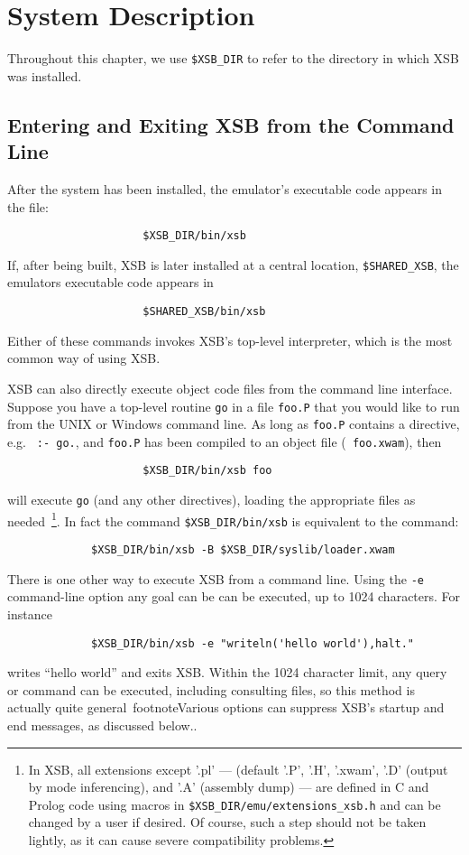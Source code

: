 \chapter{System Description} \label{chap:system}
\label{system}


Throughout this chapter, we use \verb'$XSB_DIR' to refer to the
directory in which XSB was installed.

\section{Entering and Exiting XSB from the Command Line}

After the system has been installed, the emulator's executable code appears 
in the file:
\begin{verbatim}
                     $XSB_DIR/bin/xsb
\end{verbatim}
If, after being built, XSB is later installed  at a central location,
\verb'$SHARED_XSB', the emulators executable code appears in
\begin{verbatim}
                     $SHARED_XSB/bin/xsb
\end{verbatim}
Either of these commands invokes XSB's top-level interpreter, which is
the most common way of using XSB.

XSB can also directly execute object code files from the command line
interface.  Suppose you have a top-level routine {\tt go} in a file
{\tt foo.P} that you would like to run from the UNIX or Windows
command line.  As long as {\tt foo.P} contains a directive, e.g. {\tt
  :- go.}, and {\tt foo.P} has been compiled to an object file ({\tt
  foo.xwam}), then
\begin{verbatim}
                     $XSB_DIR/bin/xsb foo
\end{verbatim}
will execute {\tt go} (and any other directives), loading the
appropriate files as needed~\footnote{In XSB, all extensions except
  '.pl' --- (default '.P', '.H', '.xwam', '.D' (output by mode
  inferencing), and '.A' (assembly dump) --- are defined in C and
  Prolog code using macros in {\tt \$XSB\_DIR/emu/extensions\_xsb.h}
  and can be changed by a user if desired.  Of course, such a step
  should not be taken lightly, as it can cause severe compatibility
  problems.}.
%
In fact the command
\verb'$XSB_DIR/bin/xsb' is equivalent to the command:
\begin{verbatim}
             $XSB_DIR/bin/xsb -B $XSB_DIR/syslib/loader.xwam
\end{verbatim}
There is one other way to execute XSB from a command line.  Using the
{\tt -e} command-line option any goal can be can be executed, up to
1024 characters.  For instance 
\begin{verbatim}
             $XSB_DIR/bin/xsb -e "writeln('hello world'),halt."
\end{verbatim}
writes ``hello world'' and exits XSB.  Within the 1024 character
limit, any query or command can be executed, including consulting
files, so this method is actually quite general~footnote{Various
  options can suppress XSB's startup and end messages, as discussed
  below.}.

